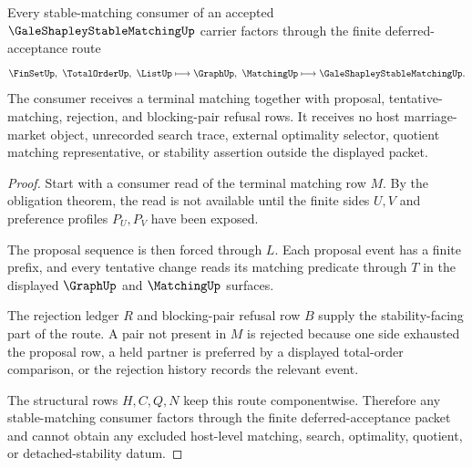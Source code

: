 \begin{theorem}
\label{thm:gale-shapley-stable-matching-deferred-acceptance-route}
Every stable-matching consumer of an accepted $\GaleShapleyStableMatchingUp$ carrier factors through the finite deferred-acceptance route
$$
\FinSetUp,\ \TotalOrderUp,\ \ListUp
\longmapsto
\GraphUp,\ \MatchingUp
\longmapsto
\GaleShapleyStableMatchingUp .
$$
The consumer receives a terminal matching together with proposal, tentative-matching, rejection, and blocking-pair refusal rows. It receives no host marriage-market object, unrecorded search trace, external optimality selector, quotient matching representative, or stability assertion outside the displayed packet.
\end{theorem}
\begin{proof}
Start with a consumer read of the terminal matching row $M$. By the obligation theorem, the read is not available until the finite sides $U,V$ and preference profiles $P_U,P_V$ have been exposed.

The proposal sequence is then forced through $L$. Each proposal event has a finite prefix, and every tentative change reads its matching predicate through $T$ in the displayed $\GraphUp$ and $\MatchingUp$ surfaces.

The rejection ledger $R$ and blocking-pair refusal row $B$ supply the stability-facing part of the route. A pair not present in $M$ is rejected because one side exhausted the proposal row, a held partner is preferred by a displayed total-order comparison, or the rejection history records the relevant event.

The structural rows $H,C,Q,N$ keep this route componentwise. Therefore any stable-matching consumer factors through the finite deferred-acceptance packet and cannot obtain any excluded host-level matching, search, optimality, quotient, or detached-stability datum.
\end{proof}


